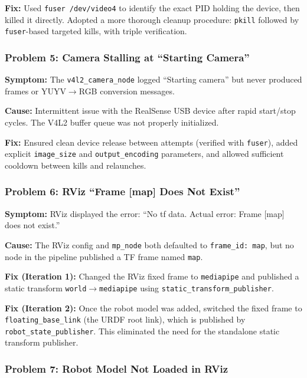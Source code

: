 \documentclass[11pt,a4paper]{article}
\begin{document}
\textbf{Fix:} Used \texttt{fuser /dev/video4} to identify the exact PID holding the device, then killed it directly. Adopted a more thorough cleanup procedure: \texttt{pkill} followed by \texttt{fuser}-based targeted kills, with triple verification.

\subsubsection{Problem 5: Camera Stalling at ``Starting Camera''}

\textbf{Symptom:} The \texttt{v4l2\_camera\_node} logged ``Starting camera'' but never produced frames or YUYV$\rightarrow$RGB conversion messages.

\textbf{Cause:} Intermittent issue with the RealSense USB device after rapid start/stop cycles. The V4L2 buffer queue was not properly initialized.

\textbf{Fix:} Ensured clean device release between attempts (verified with \texttt{fuser}), added explicit \texttt{image\_size} and \texttt{output\_encoding} parameters, and allowed sufficient cooldown between kills and relaunches.

\subsubsection{Problem 6: RViz ``Frame [map] Does Not Exist''}

\textbf{Symptom:} RViz displayed the error: ``No tf data. Actual error: Frame [map] does not exist.''

\textbf{Cause:} The RViz config and \texttt{mp\_node} both defaulted to \texttt{frame\_id: map}, but no node in the pipeline published a TF frame named \texttt{map}.

\textbf{Fix (Iteration 1):} Changed the RViz fixed frame to \texttt{mediapipe} and published a static transform \texttt{world}$\rightarrow$\texttt{mediapipe} using \texttt{static\_transform\_publisher}.

\textbf{Fix (Iteration 2):} Once the robot model was added, switched the fixed frame to \texttt{floating\_base\_link} (the URDF root link), which is published by \texttt{robot\_state\_publisher}. This eliminated the need for the standalone static transform publisher.

\subsubsection{Problem 7: Robot Model Not Loaded in RViz}
\end{document}

